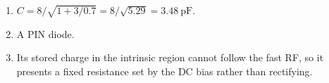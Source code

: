 \begin{enumerate}[leftmargin=1.6em,itemsep=2pt]
\item $C = 8/\sqrt{1+3/0.7} = 8/\sqrt{5.29} = 3.48\ \text{pF}$.
\item A PIN diode.
\item Its stored charge in the intrinsic region cannot follow the fast RF, so it presents a fixed resistance set by the DC bias rather than rectifying.
\end{enumerate}
